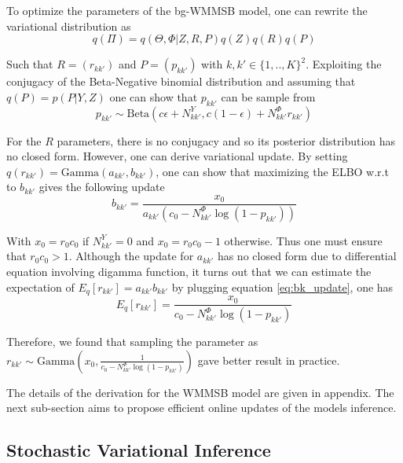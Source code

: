 To optimize the parameters of the bg-WMMSB model, one can rewrite the variational distribution as
\begin{equation*}
q(\Pi) = q(\Theta, \Phi|Z, R, P) q(Z)q(R)q(P)
\end{equation*}

Such that $R=(r_{kk'})$ and $P=(p_{kk'})$ with $k,k' \in \{1,..,K\}^2$. Exploiting the conjugacy of the Beta-Negative binomial distribution and assuming that $q(P)=p(P|Y,Z)$  one can show that $p_{kk'}$ can be sample from
\begin{equation} \label{eq:pk_update}
p_{kk'} \sim \textrm{Beta}(c\epsilon + N^Y_{kk'}, c(1-\epsilon) + N^\Phi_{kk'}r_{kk'})
\end{equation}

For the $R$ parameters, there is no conjugacy and so its posterior distribution has no closed form. However, one can derive variational update. By setting $q(r_{kk'}) = \textrm{Gamma}(a_{kk'},b_{kk'})$, one can show that maximizing the ELBO w.r.t to $b_{kk'}$ gives the following update
\begin{equation} \label{eq:bk_update}
b_{kk'}= \frac{x_0}{a_{kk'} (c_0  -N^\Phi_{kk'}\log(1-p_{kk'}))}
\end{equation}

With $x_0 = r_0 c_0$ if $N^Y_{kk'}=0$ and $x_0 = r_0 c_0 -1$ otherwise. Thus one must ensure that $r_0 c_0 > 1$. Although the update for $a_{kk'}$ has no closed form due to differential equation involving digamma function, it turns out that we can estimate the expectation of $E_q[r_{kk'}]=a_{kk'}b_{kk'}$ by plugging equation \eqref{eq:bk_update}, one has
\begin{equation} \label{eq:rk_update}
E_q[r_{kk'}] = \frac{x_0}{c_0  -N^\Phi_{kk'}\log(1-p_{kk'})}
\end{equation}

Therefore, we found  that sampling the parameter as $r_{kk'} \sim \textrm{Gamma}(x_0,\frac{1}{c_0  -N^\Phi_{kk'}\log(1-p_{kk'})} )$ gave better result in practice.

The details of the derivation for the WMMSB model are given in appendix.
The next sub-section aims to propose efficient online updates of the models inference.

\subsection{Stochastic Variational Inference}

